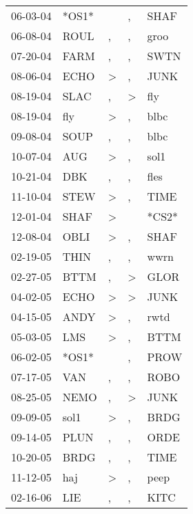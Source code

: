 \begin{supertabular}{lllll}
 06-03-04 &  *OS1* &                  &             , &   SHAF \\
 06-08-04 &   ROUL &                , &             , &   groo \\
 07-20-04 &   FARM &                , &             , &   SWTN \\
 08-06-04 &   ECHO &     \textgreater &             , &   JUNK \\
 08-19-04 &   SLAC &                , &  \textgreater &    fly \\
 08-19-04 &    fly &     \textgreater &             , &   blbc \\
 09-08-04 &   SOUP &                , &             , &   blbc \\
 10-07-04 &    AUG &     \textgreater &             , &   sol1 \\
 10-21-04 &    DBK &                , &             , &   fles \\
 11-10-04 &   STEW &     \textgreater &             , &   TIME \\
 12-01-04 &   SHAF &     \textgreater &               &  *CS2* \\
 12-08-04 &   OBLI &     \textgreater &             , &   SHAF \\
 02-19-05 &   THIN &                , &             , &   wwrn \\
 02-27-05 &   BTTM &                , &  \textgreater &   GLOR \\
 04-02-05 &   ECHO &     \textgreater &  \textgreater &   JUNK \\
 04-15-05 &   ANDY &     \textgreater &             , &   rwtd \\
 05-03-05 &    LMS &     \textgreater &             , &   BTTM \\
 06-02-05 &  *OS1* &                  &             , &   PROW \\
 07-17-05 &    VAN &                , &             , &   ROBO \\
 08-25-05 &   NEMO &                , &  \textgreater &   JUNK \\
 09-09-05 &   sol1 &     \textgreater &             , &   BRDG \\
 09-14-05 &   PLUN &                , &             , &   ORDE \\
 10-20-05 &   BRDG &                , &             , &   TIME \\
 11-12-05 &    haj &     \textgreater &             , &   peep \\
 02-16-06 &    LIE &                , &             , &   KITC \\

\end{supertabular}
